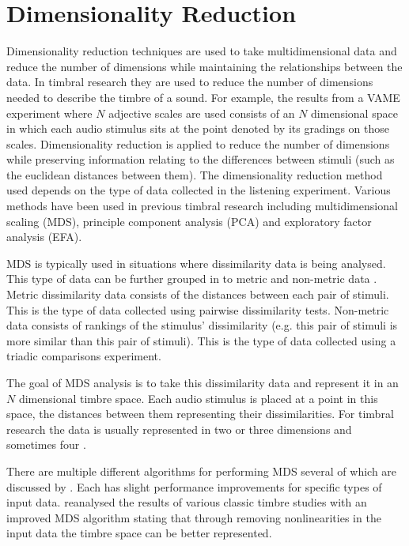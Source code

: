 	\section{Dimensionality Reduction}
	\label{sec:Timbre-Parameterisation-DimensionalityReduction}
		Dimensionality reduction techniques are used to take multidimensional data and reduce the number of
		dimensions while maintaining the relationships between the data. In timbral research they are used to
		reduce the number of dimensions needed to describe the timbre of a sound. For example, the results from a
		VAME experiment where $N$ adjective scales are used consists of an $N$ dimensional space in which each
		audio stimulus sits at the point denoted by its gradings on those scales. Dimensionality reduction is
		applied to reduce the number of dimensions while preserving information relating to the differences between
		stimuli (such as the euclidean distances between them). The dimensionality reduction method used depends on
		the type of data collected in the listening experiment.  Various methods have been used in previous timbral
		research including multidimensional scaling (MDS), principle component analysis (PCA) and exploratory
		factor analysis (EFA).

		MDS is typically used in situations where dissimilarity data is being analysed. This type of data can be
		further grouped in to metric and non-metric data \citep{hair2013multivariate}. Metric dissimilarity data
		consists of the distances between each pair of stimuli. This is the type of data collected using pairwise
		dissimilarity tests. Non-metric data consists of rankings of the stimulus' dissimilarity (e.g. this pair of
		stimuli is more similar than this pair of stimuli). This is the type of data collected using a triadic
		comparisons experiment.

		The goal of MDS analysis is to take this dissimilarity data and represent it in an $N$ dimensional timbre
		space.  Each audio stimulus is placed at a point in this space, the distances between them representing
		their dissimilarities. For timbral research the data is usually represented in two
		\citep{giragama2003relating} or three \citep{grey1978perceptual} dimensions and sometimes four
		\citep{bernays2011verbal}.
		
		There are multiple different algorithms for performing MDS several of which are discussed by
		\citet{mcadams1999perspectives}. Each has slight performance improvements for specific types of input data.
		\citet{burgoyne2008a} reanalysed the results of various classic timbre studies with an improved MDS
		algorithm stating that through removing nonlinearities in the input data the timbre space can be better
		represented.

